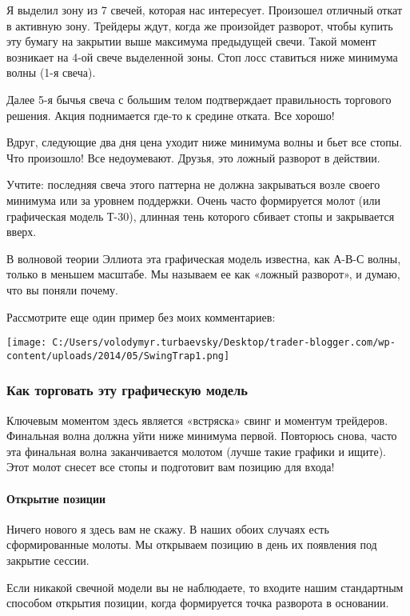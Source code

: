 \documentclass[a5paper]{article}
\begin{document}
Я выделил зону из 7 свечей, которая нас интересует. Произошел отличный откат в активную зону. Трейдеры ждут, когда же произойдет разворот, чтобы купить эту бумагу на закрытии выше максимума предыдущей свечи. Такой момент возникает на 4-ой свече выделенной зоны. Стоп лосс ставиться ниже минимума волны (1-я свеча).

Далее 5-я бычья свеча с большим телом подтверждает правильность торгового решения. Акция поднимается где-то к средине отката. Все хорошо!

Вдруг, следующие два дня цена уходит ниже минимума волны и бьет все стопы. Что произошло! Все недоумевают. Друзья, это ложный разворот в действии.

Учтите: последняя свеча этого паттерна не должна закрываться возле своего минимума или за уровнем поддержки. Очень часто формируется молот (или графическая модель Т-30), длинная тень которого сбивает стопы и закрывается вверх.

В волновой теории Эллиота эта графическая модель известна, как А-В-С волны, только в меньшем масштабе. Мы называем ее как «ложный разворот», и думаю, что вы поняли почему.

Рассмотрите еще один пример без моих комментариев:

\texttt{[image: C:/Users/volodymyr.turbaevsky/Desktop/trader-blogger.com/wp-content/uploads/2014/05/SwingTrap1.png]}

\subsubsection{Как торговать эту графическую модель}

Ключевым моментом здесь является «встряска» свинг и моментум
трейдеров. Финальная волна должна уйти ниже минимума первой. Повторюсь
снова, часто эта финальная волна заканчивается молотом (лучше такие
графики и ищите). Этот молот снесет все стопы и подготовит вам позицию
для входа!

\paragraph{Открытие позиции}

Ничего нового я здесь вам не скажу. В наших обоих случаях есть сформированные молоты. Мы открываем позицию в день их появления под закрытие сессии.

Если никакой свечной модели вы не наблюдаете, то входите нашим стандартным способом открытия позиции, когда формируется точка разворота в основании.
\end{document}
